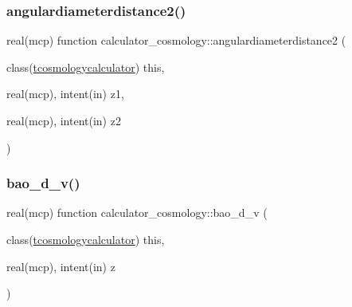 \mbox{\label{namespacecalculator__cosmology_a3a138f6f81a4341d3017e38fce77b905}} 
\subsubsection{\texorpdfstring{angulardiameterdistance2()}{angulardiameterdistance2()}}
{\footnotesize\ttfamily real(mcp) function calculator\+\_\+cosmology\+::angulardiameterdistance2 (\begin{DoxyParamCaption}\item[{class(\mbox{\hyperlink{structcalculator__cosmology_1_1tcosmologycalculator}{tcosmologycalculator}})}]{this,  }\item[{real(mcp), intent(in)}]{z1,  }\item[{real(mcp), intent(in)}]{z2 }\end{DoxyParamCaption})\hspace{0.3cm}{\ttfamily [private]}}

\mbox{\label{namespacecalculator__cosmology_ab4785ac8ce58853984614bac368590aa}} 
\subsubsection{\texorpdfstring{bao\+\_\+d\+\_\+v()}{bao\_d\_v()}}
{\footnotesize\ttfamily real(mcp) function calculator\+\_\+cosmology\+::bao\+\_\+d\+\_\+v (\begin{DoxyParamCaption}\item[{class(\mbox{\hyperlink{structcalculator__cosmology_1_1tcosmologycalculator}{tcosmologycalculator}})}]{this,  }\item[{real(mcp), intent(in)}]{z }\end{DoxyParamCaption})\hspace{0.3cm}{\ttfamily [private]}}

\mbox{\label{namespacecalculator__cosmology_a6178a84302763ba24c2283bf6e8e5b2b}} 
